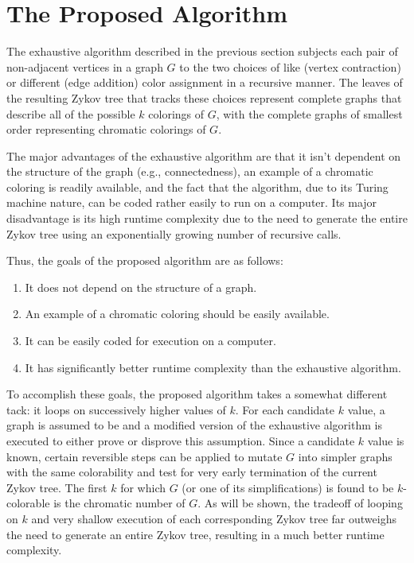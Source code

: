 \section{The Proposed Algorithm}

The exhaustive algorithm described in the previous section subjects each pair of non-adjacent vertices in a graph
\(G\) to the two choices of like (vertex contraction) or different (edge addition) color assignment in a recursive
manner.  The leaves of the resulting Zykov tree that tracks these choices represent complete graphs that describe
all of the possible \(k\) colorings of \(G\), with the complete graphs of smallest order representing chromatic
colorings of \(G\).

The major advantages of the exhaustive algorithm are that it isn't dependent on the structure of the graph (e.g.,
connectedness), an example of a chromatic coloring is readily available, and the fact that the algorithm, due to
its Turing machine nature, can be coded rather easily to run on a computer.  Its major disadvantage is its high
runtime complexity due to the need to generate the entire Zykov tree using an exponentially growing number of
recursive calls.

Thus, the goals of the proposed algorithm are as follows:
\begin{enumerate}
\item It does not depend on the structure of a graph.
\item An example of a chromatic coloring should be easily available.
\item It can be easily coded for execution on a computer.
\item It has significantly better runtime complexity than the exhaustive algorithm.
\end{enumerate}

To accomplish these goals, the proposed algorithm takes a somewhat different tack: it loops on successively higher
values of \(k\).  For each candidate \(k\) value, a graph is assumed to be  and a modified version of
the exhaustive algorithm is executed to either prove or disprove this assumption.  Since a candidate \(k\) value is
known, certain reversible steps can be applied to mutate \(G\) into simpler graphs with the same colorability and
test for very early termination of the current Zykov tree.  The first \(k\) for which \(G\) (or one of its
simplifications) is found to be \(k\)-colorable is the chromatic number of \(G\).  As will be shown, the tradeoff
of looping on \(k\) and very shallow execution of each corresponding Zykov tree far outweighs the need to generate
an entire Zykov tree, resulting in a much better runtime complexity.

